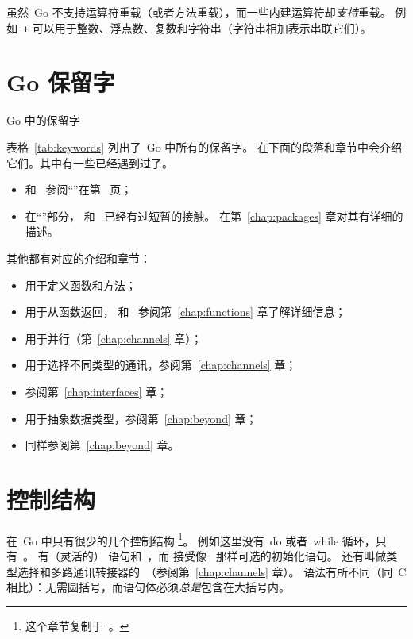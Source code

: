 虽然~Go 不支持运算符重载（或者方法重载），而一些内建运算符却\emph{支持}重载。
例如~\texttt{+} 可以用于整数、浮点数、复数和字符串（字符串相加表示串联它们）。

\section{Go 保留字}
\begin{table}[H]
\begin{center}
\caption{Go 中的保留字}
\label{tab:keywords}

\end{center}
\end{table}
表格~\ref{tab:keywords} 列出了~Go 中所有的保留字。
在下面的段落和章节中会介绍它们。其中有一些已经遇到过了。
\begin{itemize}
\item {} 和~ 参阅``''在第~\pageref{sec:vars} 页；
\item 在``''部分， 和~ 已经有过短暂的接触。 
在第~\ref{chap:packages} 章对其有详细的描述。
\end{itemize}
其他都有对应的介绍和章节：
\begin{itemize}
\item {} 用于定义函数和方法；
\item {} 用于从函数返回， 和~
参阅第~\ref{chap:functions} 章了解详细信息；
\item {} 用于并行（第~\ref{chap:channels} 章）；
\item {} 用于选择不同类型的通讯，参阅第~\ref{chap:channels} 章；
\item {} 参阅第~\ref{chap:interfaces} 章；
\item {} 用于抽象数据类型，参阅第~\ref{chap:beyond} 章；
\item {} 同样参阅第~\ref{chap:beyond} 章。
\end{itemize}

\section{控制结构}
在~Go 中只有很少的几个控制结构
\footnote{这个章节复制于~\cite{effective_go}。}。
例如这里没有~do 或者~while 循环，只有~。
有（灵活的） 语句和~，而
 接受像~ 那样可选的初始化语句。
还有叫做类型选择和多路通讯转接器的~（参阅第~\ref{chap:channels} 章）。
语法有所不同（同~C 相比）：无需圆括号，而语句体必须\emph{总是}包含在大括号内。

